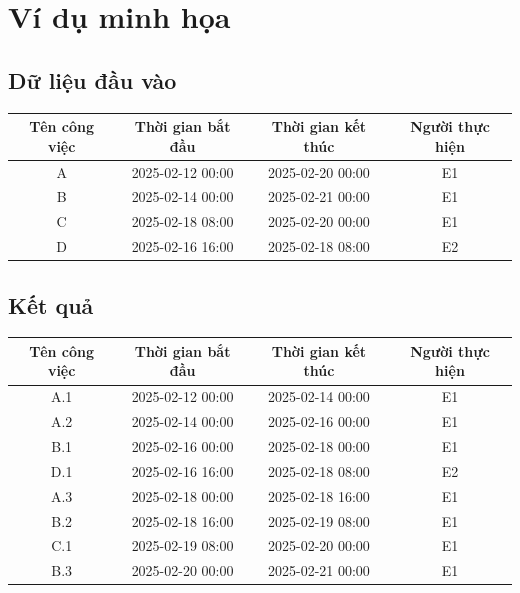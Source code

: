 \documentclass{article}
\begin{document}
\section{Ví dụ minh họa}
\subsection{Dữ liệu đầu vào}
\begin{center}
    \begin{tabular}{|c|c|c|c|}
        \hline
        Tên công việc & Thời gian bắt đầu & Thời gian kết thúc & Người thực hiện \\
        \hline
         A & 2025-02-12 00:00 & 2025-02-20 00:00 & E1 \\
        \hline
         B & 2025-02-14 00:00 & 2025-02-21 00:00 & E1 \\
        \hline
         C & 2025-02-18 08:00 & 2025-02-20 00:00 & E1 \\
        \hline
         D & 2025-02-16 16:00 & 2025-02-18 08:00 & E2 \\
        \hline
    \end{tabular}
\end{center}
\subsection{Kết quả}
\begin{center}
    \begin{tabular}{|c|c|c|c|}
        \hline
        Tên công việc & Thời gian bắt đầu & Thời gian kết thúc & Người thực hiện \\
        \hline
         A.1 & 2025-02-12 00:00 & 2025-02-14 00:00 & E1 \\
        \hline
         A.2 & 2025-02-14 00:00 & 2025-02-16 00:00 & E1 \\
        \hline
         B.1 & 2025-02-16 00:00 & 2025-02-18 00:00 & E1 \\
        \hline
         D.1 & 2025-02-16 16:00 & 2025-02-18 08:00 & E2 \\
        \hline
         A.3 & 2025-02-18 00:00 & 2025-02-18 16:00 & E1 \\
        \hline
         B.2 & 2025-02-18 16:00 & 2025-02-19 08:00 & E1 \\
        \hline
         C.1 & 2025-02-19 08:00 & 2025-02-20 00:00 & E1 \\
        \hline
         B.3 & 2025-02-20 00:00 & 2025-02-21 00:00 & E1 \\
        \hline
    \end{tabular}
\end{center}
\end{document}

